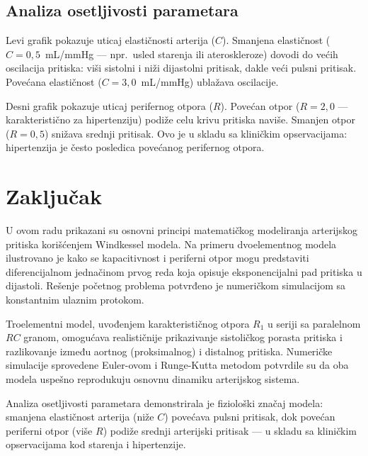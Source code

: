 \documentclass[12pt,a4paper]{article}
\begin{document}
\subsection{Analiza osetljivosti parametara}


Levi grafik pokazuje uticaj elastičnosti arterija ($C$). Smanjena elastičnost ($C = 0{,}5$~mL/mmHg --- npr.\ usled starenja ili ateroskleroze) dovodi do većih oscilacija pritiska: viši sistolni i niži dijastolni pritisak, dakle veći pulsni pritisak. Povećana elastičnost ($C = 3{,}0$~mL/mmHg) ublažava oscilacije.

Desni grafik pokazuje uticaj perifernog otpora ($R$). Povećan otpor ($R = 2{,}0$ --- karakteristično za hipertenziju) podiže celu krivu pritiska naviše. Smanjen otpor ($R = 0{,}5$) snižava srednji pritisak. Ovo je u skladu sa kliničkim opservacijama: hipertenzija je često posledica povećanog perifernog otpora.


\section{Zaključak}

U ovom radu prikazani su osnovni principi matematičkog modeliranja arterijskog pritiska korišćenjem Windkessel modela. Na primeru dvoelementnog modela ilustrovano je kako se kapacitivnost i periferni otpor mogu predstaviti diferencijalnom jednačinom prvog reda koja opisuje eksponencijalni pad pritiska u dijastoli. Rešenje početnog problema potvrđeno je numeričkom simulacijom sa konstantnim ulaznim protokom.

Troelementni model, uvođenjem karakterističnog otpora $R_1$ u seriji sa paralelnom $RC$ granom, omogućava realističnije prikazivanje sistoličkog porasta pritiska i razlikovanje između aortnog (proksimalnog) i distalnog pritiska. Numeričke simulacije sprovedene Euler-ovom i Runge-Kutta metodom potvrdile su da oba modela uspešno reprodukuju osnovnu dinamiku arterijskog sistema.

Analiza osetljivosti parametara demonstrirala je fiziološki značaj modela: smanjena elastičnost arterija (niže $C$) povećava pulsni pritisak, dok povećan periferni otpor (više $R$) podiže srednji arterijski pritisak --- u skladu sa kliničkim opservacijama kod starenja i hipertenzije.
\end{document}
